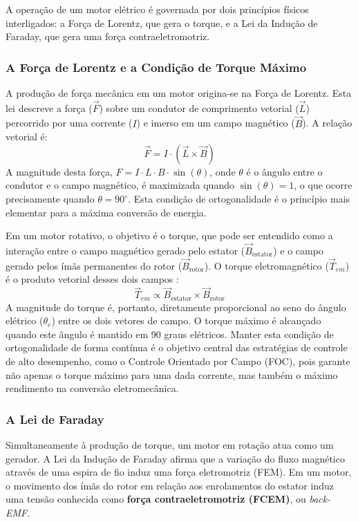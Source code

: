 A operação de um motor elétrico é governada por dois princípios físicos interligados: a Força de Lorentz, que gera o torque, e a Lei da Indução de Faraday, que gera uma força contraeletromotriz.

\subsubsection{A Força de Lorentz e a Condição de Torque Máximo}

A produção de força mecânica em um motor origina-se na Força de Lorentz. Esta lei descreve a força ($\vec{F}$) sobre um condutor de comprimento vetorial ($\vec{L}$) percorrido por uma corrente ($I$) e imerso em um campo magnético ($\vec{B}$). A relação vetorial é:
\begin{equation}
    \vec{F} = I \cdot (\vec{L} \times \vec{B})
\end{equation}
A magnitude desta força, $F = I \cdot L \cdot B \cdot \sin(\theta)$, onde $\theta$ é o ângulo entre o condutor e o campo magnético, é maximizada quando $\sin(\theta) = 1$, o que ocorre precisamente quando $\theta = 90^{\circ}$. Esta condição de ortogonalidade é o princípio mais elementar para a máxima conversão de energia.

Em um motor rotativo, o objetivo é o torque, que pode ser entendido como a interação entre o campo magnético gerado pelo estator ($\vec{B}_{\text{estator}}$) e o campo gerado pelos ímãs permanentes do rotor ($\vec{B}_{\text{rotor}}$). O torque eletromagnético ($\vec{T}_{em}$) é o produto vetorial desses dois campos \cite{vas1998vector}:
\begin{equation}
    \vec{T}_{em} \propto \vec{B}_{\text{estator}} \times \vec{B}_{\text{rotor}}
\end{equation}
A magnitude do torque é, portanto, diretamente proporcional ao seno do ângulo elétrico ($\theta_e$) entre os dois vetores de campo. O torque máximo é alcançado quando este ângulo é mantido em 90 graus elétricos. Manter esta condição de ortogonalidade de forma contínua é o objetivo central das estratégias de controle de alto desempenho, como o Controle Orientado por Campo (FOC), pois garante não apenas o torque máximo para uma dada corrente, mas também o máximo rendimento na conversão eletromecânica.

\subsubsection{A Lei de Faraday}
Simultaneamente à produção de torque, um motor em rotação atua como um gerador. A Lei da Indução de Faraday afirma que a variação do fluxo magnético através de uma espira de fio induz uma força eletromotriz (FEM). Em um motor, o movimento dos ímãs do rotor em relação aos enrolamentos do estator induz uma tensão conhecida como \textbf{força contraeletromotriz (FCEM)}, ou \textit{back-EMF}.

